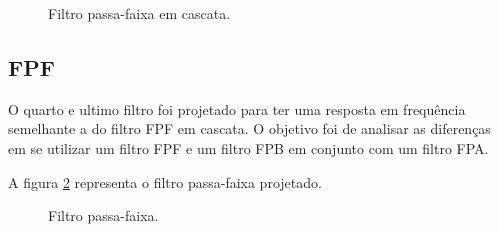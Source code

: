 \begin{figure}[H]
  \centering
  \label{fFPFC}
  \caption{Filtro passa-faixa em cascata.}
\end{figure}

\subsection{FPF}
O quarto e ultimo filtro foi projetado para ter uma resposta em frequência 
semelhante a do filtro FPF em cascata. O objetivo foi de analisar as diferenças 
em se utilizar um filtro FPF e um filtro FPB em conjunto com um filtro FPA.

A figura \ref{fFPF} representa o filtro passa-faixa projetado.

\begin{figure}[H]
  \centering
  \label{fFPF}
  \caption{Filtro passa-faixa.}
\end{figure}